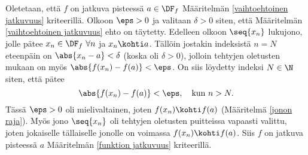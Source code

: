 \fbox{$\Leftarrow$} Oletetaan, että $f$ on jatkuva pisteessä $a\in\DF_f$ Määritelmän
\ref{vaihtoehtoinen jatkuvuus} kriteerillä. Olkoon $\eps>0$ ja valitaan $\delta>0$ siten, että
Määritelmän \ref{vaihtoehtoinen jatkuvuus} ehto on täytetty. Edelleen olkoon $\seq{x_n}$
lukujono, jolle pätee $x_n\in\DF_f\ \forall n$ ja $x_n \kohti a$. Tällöin jostakin indeksistä
$n=N$ eteenpäin on $\abs{x_n-a}<\delta$ (koska oli $\delta>0$), jolloin tehtyjen oletusten
mukaan on myös $\abs{f(x_n)-f(a)}<\eps$. On siis löydetty indeksi $N\in\N$ siten, että pätee
\[
\abs{f(x_n)-f(a)} < \eps, \quad \text{kun}\ n>N.
\]
Tässä $\eps>0$ oli mielivaltainen, joten $f(x_n) \kohti f(a)$ (Määritelmä \ref{jonon raja}).
Myös jono $\seq{x_n}$ oli tehtyjen oletusten puitteissa vapaasti valittu, joten jokaiselle 
tällaiselle jonolle on voimassa $f(x_n) \kohti f(a)$. Siis $f$ on jatkuva pisteessä $a$
Määritelmän \ref{funktion jatkuvuus} kriteerillä. \loppu

